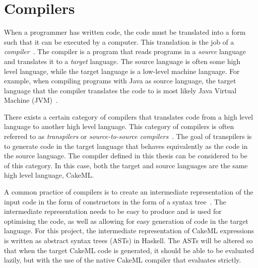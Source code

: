 \section{Compilers}
When a programmer has written code, the code must be translated into a form such
that it can be executed by a computer. This translation is the job of a
\textit{compiler}~\cite{DragonBook}. The compiler is a program that reads
programs in a \textit{source} language and translates it to a \textit{target}
language. The source language is often some high level language, while the
target language is a low-level machine language.
For example, when compiling programs with Java as source language, the target
language that the compiler translates the code to is most likely Java Virtual
Machine (JVM)~\cite{JavaJVM}.

There exists a certain category of compilers that translates code from a
high level language to another high level language. This category of compilers
is often referred to as \textit{transpilers} or
\textit{source-to-source compilers}~\cite{kulkarnitranspiler}.
The goal of transpilers is to generate code in the target language that behaves
equivalently as the code in the source language. The compiler defined in this %
thesis can be considered to be of this category. In this case, both the target
and source languages are the same high level language, CakeML.

A common practice of compilers is to create an intermediate representation of
the input code in the form of constructors in the form of a syntax
tree~\cite{DragonBook}. The intermediate representation needs to be
easy to produce and is used for optimising the code, as well as allowing for
easy generation of code in the target language.
For this project, the intermediate representation of CakeML expressions is %
written as abstract syntax trees (ASTs) in Haskell. The ASTs will be altered so
that when the target CakeML code is generated, it should be able to be evaluated
lazily, but with the use of the native CakeML compiler that evaluates strictly.
